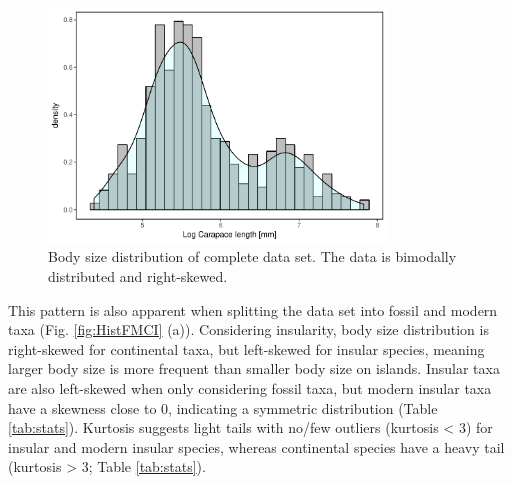 \begin{figure}[htbp]
	\centering
	\includegraphics[width=0.8\textwidth]{MA_JJ_files/figure-latex/HistAll-1.pdf}
	\caption[Body size distribution of complete data set]{Body size distribution of complete data set. The data is bimodally distributed and right-skewed.}
	\label{fig:histAll}
\end{figure}

This pattern is also apparent when splitting the data set into fossil and modern taxa (Fig. \ref{fig:HistFMCI} (a)). Considering insularity, body size distribution is right-skewed for continental taxa, but left-skewed for insular species, meaning larger body size is more frequent than smaller body size on islands. Insular taxa are also left-skewed when only considering fossil taxa, but modern insular taxa have a skewness close to 0, indicating a symmetric distribution (Table \ref{tab:stats}).
Kurtosis suggests light tails with no/few outliers (kurtosis < 3) for insular and modern insular species, whereas continental species have a heavy tail (kurtosis > 3; Table \ref{tab:stats}).

